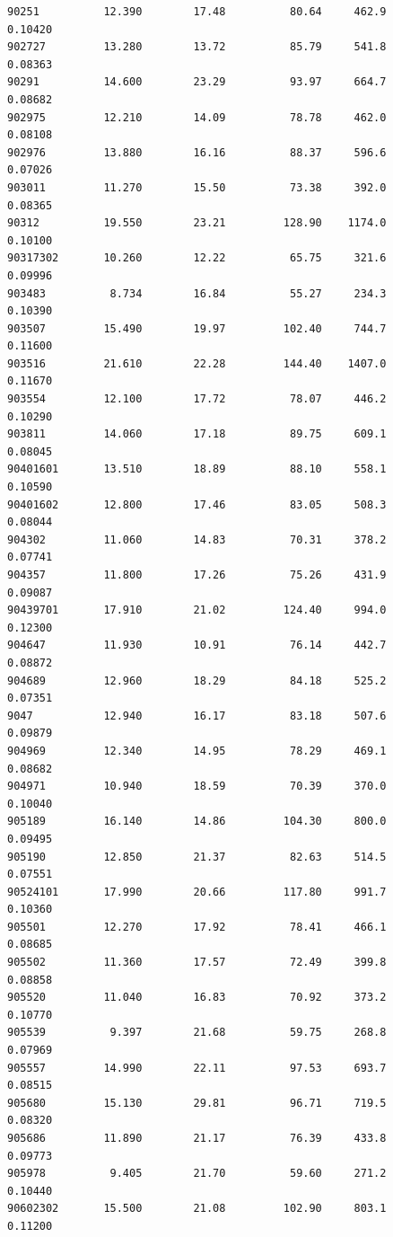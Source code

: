\documentclass[
  letterpaper,
  DIV=11,
  numbers=noendperiod]{scrartcl}
\begin{document}
\begin{verbatim}
90251          12.390        17.48          80.64     462.9         0.10420
902727         13.280        13.72          85.79     541.8         0.08363
90291          14.600        23.29          93.97     664.7         0.08682
902975         12.210        14.09          78.78     462.0         0.08108
902976         13.880        16.16          88.37     596.6         0.07026
903011         11.270        15.50          73.38     392.0         0.08365
90312          19.550        23.21         128.90    1174.0         0.10100
90317302       10.260        12.22          65.75     321.6         0.09996
903483          8.734        16.84          55.27     234.3         0.10390
903507         15.490        19.97         102.40     744.7         0.11600
903516         21.610        22.28         144.40    1407.0         0.11670
903554         12.100        17.72          78.07     446.2         0.10290
903811         14.060        17.18          89.75     609.1         0.08045
90401601       13.510        18.89          88.10     558.1         0.10590
90401602       12.800        17.46          83.05     508.3         0.08044
904302         11.060        14.83          70.31     378.2         0.07741
904357         11.800        17.26          75.26     431.9         0.09087
90439701       17.910        21.02         124.40     994.0         0.12300
904647         11.930        10.91          76.14     442.7         0.08872
904689         12.960        18.29          84.18     525.2         0.07351
9047           12.940        16.17          83.18     507.6         0.09879
904969         12.340        14.95          78.29     469.1         0.08682
904971         10.940        18.59          70.39     370.0         0.10040
905189         16.140        14.86         104.30     800.0         0.09495
905190         12.850        21.37          82.63     514.5         0.07551
90524101       17.990        20.66         117.80     991.7         0.10360
905501         12.270        17.92          78.41     466.1         0.08685
905502         11.360        17.57          72.49     399.8         0.08858
905520         11.040        16.83          70.92     373.2         0.10770
905539          9.397        21.68          59.75     268.8         0.07969
905557         14.990        22.11          97.53     693.7         0.08515
905680         15.130        29.81          96.71     719.5         0.08320
905686         11.890        21.17          76.39     433.8         0.09773
905978          9.405        21.70          59.60     271.2         0.10440
90602302       15.500        21.08         102.90     803.1         0.11200

\end{verbatim}
\end{document}
